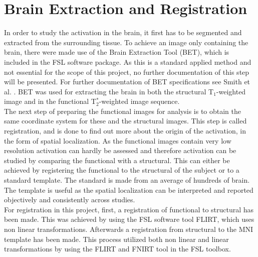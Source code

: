\section{Brain Extraction and Registration} \label{BET}

In order to study the activation in the brain, it first has to be segmented and extracted from the surrounding tissue. To achieve an image only containing the brain, there were made use of the Brain Extraction Tool (BET), which is included in the FSL software package. As this is a standard applied method and not essential for the scope of this project, no further documentation of this step will be presented. For further documentation of BET specifications see Smith et al. \cite{Smith2002}. BET was used for extracting the brain in both the structural T$_1$-weighted image and in the functional T$_{2}^*$-weighted image sequence.    \\
The next step of preparing the functional images for analysis is to obtain the same coordinate system for these and the structural images. This step is called registration, and is done to find out more about the origin of the activation, in the form of spatial localization. As the functional images contain very low resolution activation can hardly be assessed and therefore activation can be studied by comparing the functional with a structural. This can either be achieved by registering the functional to the structural of the subject or to a standard template. The standard is made from an average of hundreds of brain. The template is useful as the spatial localization can be interpreted and reported objectively and consistently across studies. \cite{Hajnal2001}\\
For registration in this project, first, a registration of functional to structural has been made. This was achieved by using the FSL software tool FLIRT, which uses non linear transformations. Afterwards a registration from structural to the MNI template has been made. This process utilized both non linear and linear transformations by using the FLIRT and FNIRT tool in the FSL toolbox. \cite{Andersson2007,Jenkinson2001}
